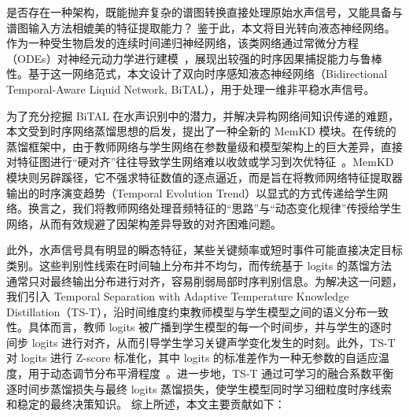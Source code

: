 \documentclass[a4paper, 12pt]{article}
\begin{document}
是否存在一种架构，既能抛弃复杂的谱图转换直接处理原始水声信号，又能具备与谱图输入方法相媲美的特征提取能力？
鉴于此，本文将目光转向液态神经网络。作为一种受生物启发的连续时间递归神经网络，该类网络通过常微分方程（ODEs）对神经元动力学进行建模~\cite{Chen2018NeuralODE,Hasani2021LTC,Hasani2022CfC}，展现出较强的时序因果捕捉能力与鲁棒性。基于这一网络范式，本文设计了双向时序感知液态神经网络（Bidirectional Temporal-Aware Liquid Network, BiTAL），用于处理一维非平稳水声信号。

为了充分挖掘 BiTAL 在水声识别中的潜力，并解决异构网络间知识传递的难题，本文受到时序网络蒸馏思想的启发，提出了一种全新的 MemKD 模块。在传统的蒸馏框架中，由于教师网络与学生网络在参数量级和模型架构上的巨大差异，直接对特征图进行“硬对齐”往往导致学生网络难以收敛或学习到次优特征~\cite{Yim2017FSP,Zagoruyko2017AT,Ahn2019VID}。MemKD 模块则另辟蹊径，它不强求特征数值的逐点逼近，而是旨在将教师网络特征提取器输出的时序演变趋势（Temporal Evolution Trend）以显式的方式传递给学生网络。换言之，我们将教师网络处理音频特征的“思路”与“动态变化规律”传授给学生网络，从而有效规避了因架构差异导致的对齐困难问题。

此外，水声信号具有明显的瞬态特征，某些关键频率或短时事件可能直接决定目标类别。这些判别性线索在时间轴上分布并不均匀，而传统基于 logits 的蒸馏方法通常只对最终输出分布进行对齐，容易削弱局部时序判别信息。为解决这一问题，我们引入 Temporal Separation with Adaptive Temperature Knowledge Distillation（TS-T），沿时间维度约束教师模型与学生模型之间的语义分布一致性。具体而言，教师 logits 被广播到学生模型的每一个时间步，并与学生的逐时间步 logits 进行对齐，从而引导学生学习关键声学变化发生的时刻。此外，TS-T 对 logits 进行 Z-score 标准化，其中 logits 的标准差作为一种无参数的自适应温度，用于动态调节分布平滑程度~\cite{Sun2024LSKD}。进一步地，TS-T 通过可学习的融合系数平衡逐时间步蒸馏损失与最终 logits 蒸馏损失，使学生模型同时学习细粒度时序线索和稳定的最终决策知识。
综上所述，本文主要贡献如下：
\end{document}
